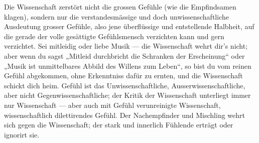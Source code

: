 Die Wissenschaft zerstört nicht die grossen Gefühle (wie die Empfindsamen klagen), sondern nur die verstandesmässige und doch unwissenschaftliche Ausdeutung grosser Gefühle, also jene überflüssige und entstellende Halbheit, auf die gerade der volle gesättigte Gefühlsmensch verzichten kann und gern verzichtet. Sei mitleidig oder liebe Musik — die Wissenschaft wehrt dir’s nicht; aber wenn du sagst „Mitleid durchbricht die Schranken der Erscheinung“ oder „Musik ist unmittelbares Abbild des Willens zum Leben“, so bist du vom reinen Gefühl abgekommen, ohne Erkenntniss dafür zu ernten, und die Wissenschaft schickt dich heim. Gefühl ist das Unwissenschaftliche, Ausserwissenschaftliche, aber nicht Gegenwissenschaftliche; der Kritik der Wissenschaft unterliegt immer nur Wissenschaft — aber auch mit Gefühl verunreinigte Wissenschaft, wissenschaftlich dilettirendes Gefühl. Der Nachempfinder und Mischling wehrt sich gegen die Wissenschaft; der stark und innerlich Fühlende erträgt oder ignorirt sie.
\par

